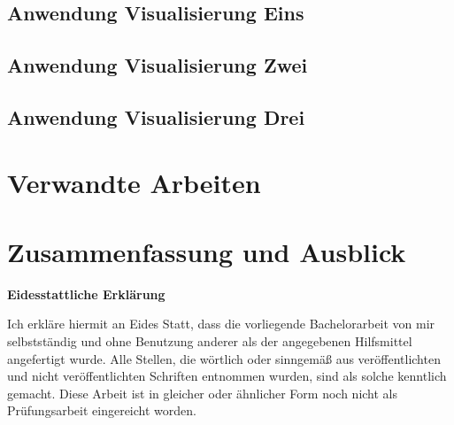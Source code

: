 \documentclass[paper=a4,12pt,titlepage,listof=totoc]{scrartcl}
\begin{document}
\subsection{Anwendung Visualisierung Eins}

\subsection{Anwendung Visualisierung Zwei}

\subsection{Anwendung Visualisierung Drei}
\newpage

\section{Verwandte Arbeiten}
\newpage
\section{Zusammenfassung und Ausblick}	
\newpage




\setlength{\parskip}{0.8\baselineskip}
\cleardoublepage
{}
\printbibliography

\clearpage

\iffalse

\begin{center}
\textbf{Eidesstattliche Erklärung}%
\end{center}


Ich erkläre hiermit an Eides Statt, dass die vorliegende Bachelorarbeit von mir selbstständig und ohne Benutzung anderer als der angegebenen Hilfsmittel angefertigt wurde. Alle Stellen, die wörtlich oder sinngemäß aus veröffentlichten und nicht veröffentlichten Schriften entnommen wurden, sind als solche kenntlich gemacht.
Diese Arbeit ist in gleicher oder ähnlicher Form noch nicht als Prüfungsarbeit eingereicht worden.
\end{document}
